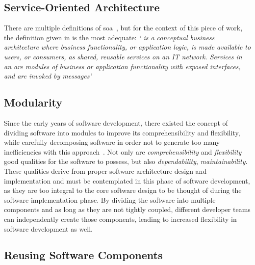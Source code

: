 \subsection{Service-Oriented Architecture}\label{state-of-the-art:ss:service-oriented-architecture}

There are multiple definitions of \gls{soa}~\Parencite{niknejad_ismail_ghani_nazari_bahari_hussin_2020}, but for the context of this piece of work, the definition given in \Parencite{marks2008service} is the most adequate:
\textit{` is a conceptual business architecture where business functionality, or application logic, is
made available to  users, or consumers, as shared, reusable services on an IT network. Services
in an  are modules of business or application functionality with exposed interfaces, and are
invoked by messages'}

\subsection{Modularity}\label{state-of-the-art:ss:modularity}

Since the early years of software development, there existed the concept of dividing software into modules to improve its comprehensibility and flexibility, while carefully decomposing software in order not to generate too many inefficiencies with this approach~\Parencite{parnas_1972}. Not only are \textit{comprehensibility} and \textit{flexibility} good qualities for the software to possess, but also \textit{dependability}, \textit{maintainability}. These qualities derive from proper software architecture design and implementation and must be contemplated in this phase of software development, as they are too integral to the core software design to be thought of during the software implementation phase. By dividing the software into multiple components and as long as they are not tightly coupled, different developer teams can independently create those components, leading to increased flexibility in software development as well.


\subsection{Reusing Software Components}\label{state-of-the-art:ss:reusing-software-components}


